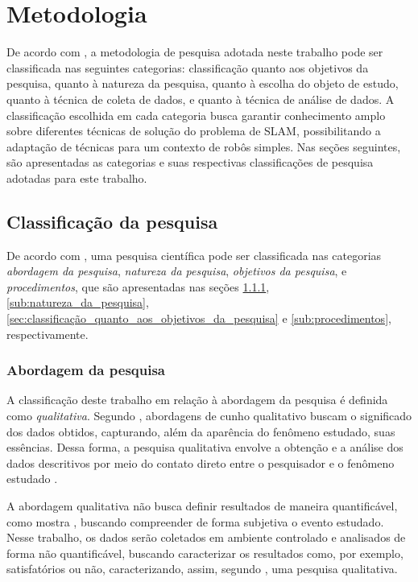 \chapter[Metodologia]{Metodologia}

	De acordo com \cite{metodologiaCientifica}, a metodologia de pesquisa adotada neste trabalho pode ser classificada nas seguintes categorias: classificação quanto aos objetivos da pesquisa, quanto à natureza da pesquisa, quanto à escolha do objeto de estudo, quanto à técnica de coleta de dados, e quanto à técnica de análise de dados. A classificação escolhida em cada categoria busca garantir conhecimento amplo sobre diferentes técnicas de solução do problema de SLAM, possibilitando a adaptação de técnicas para um contexto de robôs simples. Nas seções seguintes, são apresentadas as categorias e suas respectivas classificações de pesquisa adotadas para este trabalho. 

	\section{Classificação da pesquisa} %
	\label{sec:classificação_da_pesquisa}
		
		De acordo com \cite{metodologia}, uma pesquisa científica pode ser classificada nas categorias \textit{abordagem da pesquisa}, \textit{natureza da pesquisa}, \textit{objetivos da pesquisa}, e \textit{procedimentos}, que são apresentadas nas seções \ref{sub:abordagem_da_pesquisa}, \ref{sub:natureza_da_pesquisa}, \ref{sec:classificação_quanto_aos_objetivos_da_pesquisa} e \ref{sub:procedimentos}, respectivamente.



		\subsection{Abordagem da pesquisa} %
		\label{sub:abordagem_da_pesquisa}

			A classificação deste trabalho em relação à abordagem da pesquisa é definida como \textit{qualitativa}. Segundo \cite{metodologiaCientifica}, abordagens de cunho qualitativo buscam o significado dos dados obtidos, capturando, além da aparência do fenômeno estudado, suas essências. Dessa forma, a pesquisa qualitativa envolve a obtenção e a análise dos dados descritivos por meio do contato direto entre o pesquisador e o fenômeno estudado \cite{metodologiaCientifica}. 

			A abordagem qualitativa não busca definir resultados de maneira quantificável, como mostra \cite{metodologia}, buscando compreender de forma subjetiva o evento estudado. Nesse trabalho, os dados serão coletados em ambiente controlado e analisados de forma não quantificável, buscando caracterizar os resultados como, por exemplo, satisfatórios ou não, caracterizando, assim, segundo \cite{metodologia}, uma pesquisa qualitativa.

